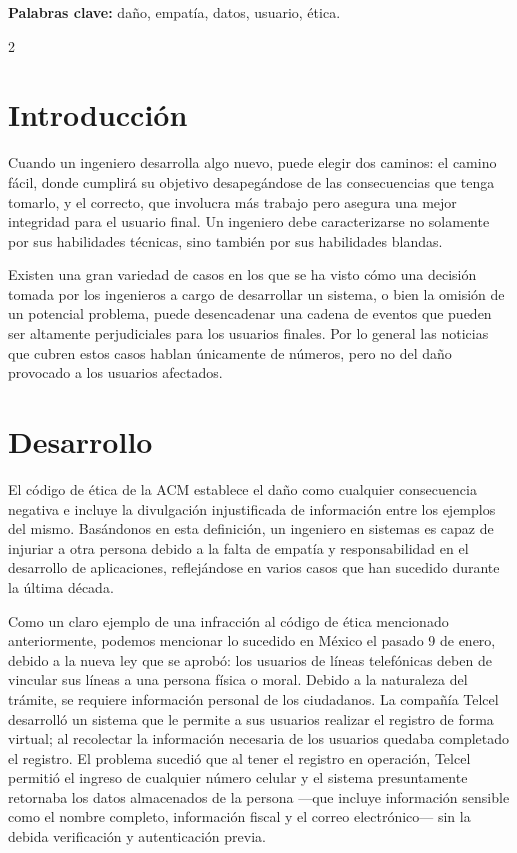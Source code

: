 \documentclass[10pt,spanish,Letterpaper,openany]{book}
\let\origtextbf\textbf
\renewcommand{\textbf}[1]{{\color{textlinetitle}\origtextbf{#1}}}
\begin{document}
\textbf{Palabras clave:} daño, empatía, datos, usuario, ética.

\begin {multicols}{2}

\section{Introducción}\label{introducciuxf3n-17}

Cuando un ingeniero desarrolla algo nuevo, puede elegir dos caminos: el camino fácil, donde cumplirá su objetivo desapegándose de las consecuencias que tenga tomarlo, y el correcto, que involucra más trabajo pero asegura una mejor integridad para el usuario final. Un ingeniero debe caracterizarse no solamente por sus habilidades técnicas, sino también por sus habilidades blandas.

Existen una gran variedad de casos en los que se ha visto cómo una decisión tomada por los ingenieros a cargo de desarrollar un sistema, o bien la omisión de un potencial problema, puede desencadenar una cadena de eventos que pueden ser altamente perjudiciales para los usuarios finales. Por lo general las noticias que cubren estos casos hablan únicamente de números, pero no del daño provocado a los usuarios afectados.

\section{Desarrollo}\label{desarrollo-7}

El código de ética de la ACM establece el daño como cualquier consecuencia negativa e incluye la divulgación injustificada de información entre los ejemplos del mismo. Basándonos en esta definición, un ingeniero en sistemas es capaz de injuriar a otra persona debido a la falta de empatía y responsabilidad en el desarrollo de aplicaciones, reflejándose en varios casos que han sucedido durante la última década.

Como un claro ejemplo de una infracción al código de ética mencionado anteriormente, podemos mencionar lo sucedido en México el pasado 9 de enero, debido a la nueva ley que se aprobó: los usuarios de líneas telefónicas deben de vincular sus líneas a una persona física o moral. Debido a la naturaleza del trámite, se requiere información personal de los ciudadanos. La compañía Telcel desarrolló un sistema que le permite a sus usuarios realizar el registro de forma virtual; al recolectar la información necesaria de los usuarios quedaba completado el registro. El problema sucedió que al tener el registro en operación, Telcel permitió el ingreso de cualquier número celular y el sistema presuntamente retornaba los datos almacenados de la persona ---que incluye información sensible como el nombre completo, información fiscal y el correo electrónico--- sin la debida verificación y autenticación previa.


\end{multicols}
\end{document}
